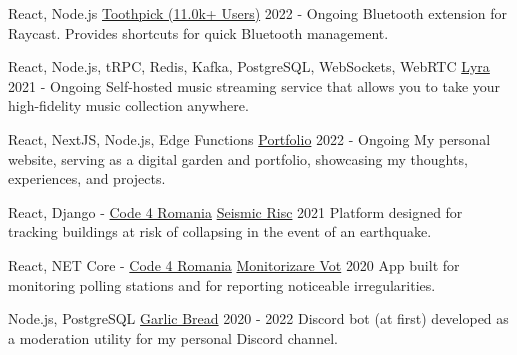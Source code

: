 
\begin{cventries}

  \cventry
  {React, Node.js}
  {\href{https://github.com/VladCuciureanu/Toothpick}{Toothpick (11.0k+ Users)}}
  {}
  {2022 - Ongoing}
  {
    Bluetooth extension for Raycast. Provides shortcuts for quick Bluetooth management.
  }

  \cventry
  {React, Node.js, tRPC, Redis, Kafka, PostgreSQL, WebSockets, WebRTC}
  {\href{https://github.com/VladCuciureanu/Lyra}{Lyra}}
  {}
  {2021 - Ongoing}
  {
    Self-hosted music streaming service that allows you to take your high-fidelity music collection anywhere.
  }

  \cventry
  {React, NextJS, Node.js, Edge Functions}
  {\href{https://vladcuciureanu.com}{Portfolio}}
  {}
  {2022 - Ongoing}
  {
    My personal website, serving as a digital garden and portfolio, showcasing my thoughts, experiences, and projects.
  }

  \cventry
  {React, Django - \href{https://code4.ro}{Code 4 Romania}}
  {\href{https://github.com/code4romania/seismic-risc}{Seismic Risc}}
  {}
  {2021}
  {
    Platform designed for tracking buildings at risk of collapsing in the event of an earthquake.
  }

  \cventry
  {React, NET Core - \href{https://code4.ro}{Code 4 Romania}}
  {\href{https://github.com/code4romania/monitorizare-vot/wiki}{Monitorizare Vot}}
  {}
  {2020}
  {
    App built for monitoring polling stations and for reporting noticeable irregularities.
  }

  \cventry
  {Node.js, PostgreSQL}
  {\href{https://github.com/VladCuciureanu/GarlicBread}{Garlic Bread}}
  {}
  {2020 - 2022}
  {
    Discord bot (at first) developed as a moderation utility for my personal Discord channel.
  }

\end{cventries}